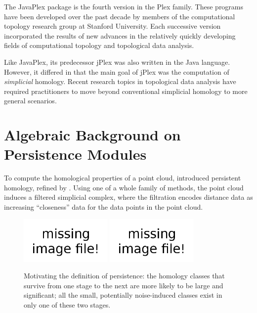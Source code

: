 \documentclass[10pt]{article}
\begin{document}
The JavaPlex package is the fourth version in the Plex family. These programs have been developed over the past decade by members of the computational topology research group at Stanford University. Each successive version incorporated the results of new advances in the relatively quickly developing fields of computational topology and topological data analysis.

Like JavaPlex, its predecessor jPlex was also written in the Java language. However, it differed in that the main goal of jPlex was the computation of \emph{simplicial} homology. Recent research topics in topological data analysis have required practitioners to move beyond conventional simplicial homology to more general scenarios.

\section{Algebraic Background on Persistence Modules}

To compute the homological properties of a point cloud,
\cite{ELZ_02} introduced persistent homology, refined by
\cite{Carlsson_04}. Using one of a whole family of methods, the point
cloud induces a filtered simplicial complex, where the filtration
encodes distance data as increasing ``closeness'' data for the data
points in the point cloud.

\begin{figure}[h]
  \centering
  \includegraphics[width=0.4\textwidth]{missing.png}
  \includegraphics[width=0.4\textwidth]{missing.png}
  \caption{Motivating the definition of persistence: the homology classes that survive from one stage to the next are more likely to be large and significant; all the small, potentially noise-induced classes exist in only one of these two stages.}
  \label{fig:betti3}
\end{figure}
\end{document}
